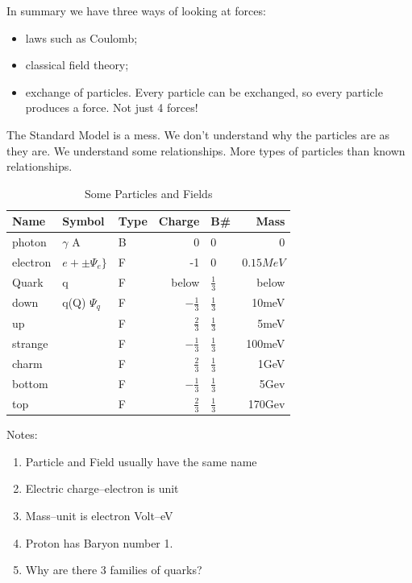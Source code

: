 \documentclass[]{article}
\begin{document}
In summary we have three ways of looking at forces:

\begin{itemize}
	\item laws such as Coulomb;
	\item classical field theory;
	\item exchange of particles. Every particle can be exchanged, so every particle produces a force. Not just 4 forces! 
\end{itemize}

The Standard Model is a mess. We don't understand why the particles are as they are. We understand some relationships. More types of particles than known relationships.

\begin{table}[H]
	\begin{center}
		\caption{Some Particles and Fields}
		\begin{tabular}{|l|l|l|r|l|r|}\hline
			Name&Symbol&Type&Charge&B\#&Mass\\ \hline
			photon&$\gamma$ A&B&0&0&0 \\ \hline
			electron&$e+\pm \Psi_e\}$&F&-1&0&$0.15MeV$\\ \hline
			Quark&q&F&below&$\frac{1}{3}$&below\\ \hline
			down&q(Q) $\Psi_q$&F&$-\frac{1}{3}$&$\frac{1}{3}$&10meV\\ \hline
			up&&F&$\frac{2}{3}$&$\frac{1}{3}$&5meV\\ \hline
			strange&&F&$-\frac{1}{3}$&$\frac{1}{3}$&100meV\\ \hline
			charm&&F&$\frac{2}{3}$&$\frac{1}{3}$&1GeV\\ \hline
			bottom&&F&$-\frac{1}{3}$&$\frac{1}{3}$&5Gev\\ \hline
			top&&F&$\frac{2}{3}$&$\frac{1}{3}$&170Gev\\ \hline
		\end{tabular}
	\end{center}
\end{table}

Notes:\begin{enumerate}
	\item Particle and Field usually have the same name
	\item Electric charge--electron is unit
	\item Mass--unit is electron Volt--eV
	\item Proton has Baryon number 1.
	\item Why are there 3 families of quarks?
\end{enumerate}
\end{document}
